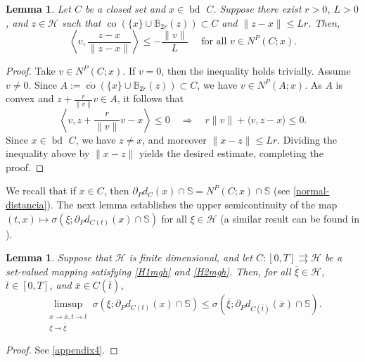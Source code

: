 \documentclass[preprint,12pt]{elsarticle}
\renewcommand{\H}{\mathcal{H}}
\newcommand{\tto}{\rightrightarrows}
\newcommand{\ov}{\overline}
\newcommand{\bd}{{\operatorname{bd \ }}}
\theoremstyle{plain}
\newtheorem{lemma}[theorem]{Lemma}
\theoremstyle{definition}
\theoremstyle{remark}
\begin{document}
\begin{lemma}\label{lemma_col_mon_1}
		Let $C$ be a closed set and $x\in\bd C$. Suppose there exist $r>0$, $L>0$, and $z\in\H$ such that $\operatorname{co}(\{x\}\cup \mathbb{B}_{2r}(z))\subset C$ and $\|z-x\|\leq Lr$. Then,
		\begin{equation*}
	 \left\langle v,\frac{z-x}{\|z-x\|} \right\rangle\leq -\frac{\|v\|}{L} \quad \textrm{ for all } v\in N^P(C;x).
		\end{equation*}
	\end{lemma}
	\begin{proof}
		Take $v\in N^P(C;x)$. If $v=0$, then the inequality holds trivially. Assume $v\neq 0$. Since $A:=\overline{\operatorname{co}}(\{x\}\cup \mathbb{B}_{2r}(z))\subset C$, we have $v\in N^P(A;x)$. As $A$ is convex and $z+\frac{r}{\|v\|}v\in A$, it follows that
		\begin{equation*}
			\left\langle v,z+ \frac{r}{\|v\|}v - x \right\rangle\leq 0 \quad \Rightarrow \quad r\|v\| + \langle v,z-x\rangle\leq 0.
		\end{equation*}
		Since $x\in\bd C$, we have $z\neq x$, and moreover $\|x-z\|\leq Lr$. Dividing the inequality above by $\|x-z\|$ yields the desired estimate, completing the proof.
	\end{proof}
	
	We recall that if $x\in C$, then $\partial_P d_C(x)\cap \mathbb{S} = N^P(C;x)\cap \mathbb{S}$ (see \eqref{normal-distancia}). The next lemma establishes the upper semicontinuity of the map $(t,x)\mapsto \sigma(\xi;\partial_P d_{C(t)}(x)\cap \mathbb{S})$ for all $\xi\in \H$ (a similar result can be found in \cite[Lemma 2]{MR4822735}). 
	\begin{lemma}\label{upper-semi-support}
	Suppose that $\H$ is finite dimensional, and let $C\colon [0,T]\tto \H$ be a set-valued mapping satisfying \ref{H1mgh} and \ref{H2mgh}. Then, for all $\ov \xi\in \H$, $\ov t\in [0,T]$, and $\ov x\in C(\ov t)$,
		\begin{equation*}
			\limsup_{\substack{x\to \ov x, t\to \ov t\\ \xi\to \ov \xi}} \sigma(\xi;\partial_P d_{C(t)}(x)\cap \mathbb{S}) \leq \sigma(\ov \xi;\partial_P d_{C(\ov t)}(\ov x)\cap \mathbb{S}).
		\end{equation*}
	\end{lemma}
    \begin{proof}
        See \ref{appendix4}.
    \end{proof}
	
\end{document}
